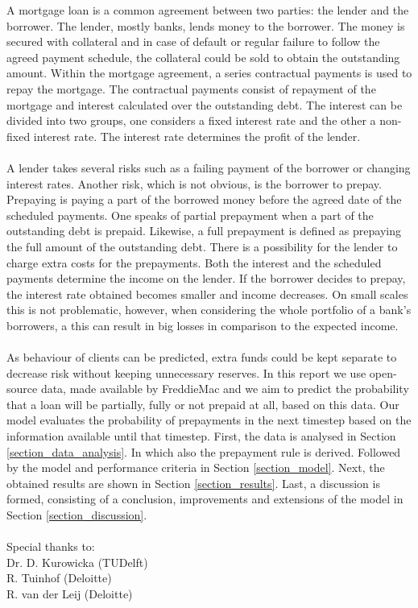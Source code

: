 A mortgage loan is a common agreement between two parties: the lender and the borrower. 
The lender, mostly banks, lends money to the borrower. The money is 
secured with collateral and in case of default or regular failure to follow 
the agreed payment schedule, the collateral could be sold to obtain the outstanding amount. Within the mortgage 
agreement, a series contractual payments is used to repay the mortgage. 
The contractual payments consist of repayment of the 
mortgage and interest calculated over the outstanding debt. 
The interest can be divided into two groups, one considers a 
fixed interest rate and the other a non-fixed interest rate. The 
interest rate determines the profit of the lender. 
\\\\
A lender takes several risks such as a failing payment of the borrower or 
changing interest rates. Another risk, which is not obvious, is the borrower to prepay. Prepaying 
is paying a part of the borrowed money before the agreed date of the 
scheduled payments. One speaks of partial prepayment when a part of 
the outstanding debt is prepaid. Likewise, a full prepayment is defined 
as prepaying the full amount of the outstanding debt. There is a possibility for the lender 
to charge extra costs for the prepayments. Both the interest and the 
scheduled payments determine the income on the lender. If the borrower decides 
to prepay, the interest rate obtained becomes smaller and income 
decreases.  On small scales this is not problematic, however, when 
considering the whole portfolio of a bank's borrowers, a this can result in big losses in comparison to the expected income.
\\\\
As behaviour of clients can be predicted, extra funds could be kept 
separate to decrease risk without keeping unnecessary reserves. In this 
report we use open-source data, made available by FreddieMac and 
we aim to predict the probability that a loan will be partially, fully or not prepaid at all, based on this data. Our model evaluates the probability of prepayments in the next 
timestep based on the information available until that timestep. First, the data is analysed in Section 
\ref{section_data_analysis}. In which also the prepayment rule is 
derived. Followed by the model and performance criteria in Section 
\ref{section_model}. Next, the obtained results are shown in 
Section \ref{section_results}. Last, a discussion is formed, 
consisting of a conclusion, improvements and extensions of the model 
in Section \ref{section_discussion}.
\\\\
Special thanks to:\\
Dr. D. Kurowicka (TUDelft)\\
R. Tuinhof (Deloitte)\\
R. van der Leij (Deloitte)
